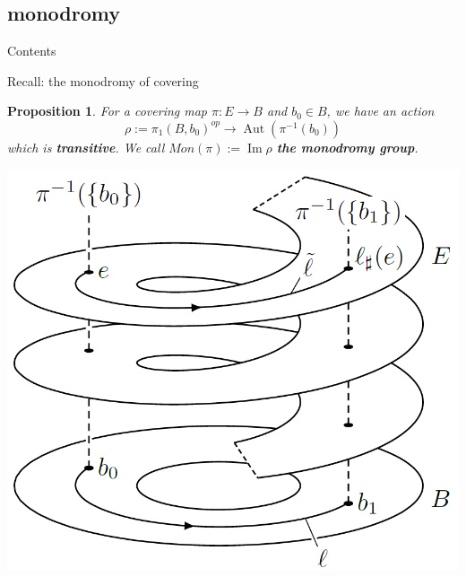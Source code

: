 \documentclass[pdf]{beamer}
\numberwithin{equation}{section}
\theoremstyle{plain}
\newtheorem{proposition}[theorem]{Proposition}
\theoremstyle{plain}
\theoremstyle{remark}
\DeclareMathOperator{\Aut}{\operatorname{Aut}}
\DeclareMathOperator{\Img}{\operatorname{Im}}
\begin{document}
\subsection{monodromy}
\begin{frame}{Contents}
\end{frame}
\begin{frame}{Recall: the monodromy of covering}
\begin{proposition}
		For a covering map $\pi \colon E \longrightarrow B$ and $b_0 \in B$, we have an action
	$$\rho:= \pi_1(B,b_0)^{op} \longrightarrow \Aut (\pi^{-1}(b_0))$$
	which is \textbf{transitive}. We call $Mon(\pi):= \Img \rho$ \textbf{the monodromy group}.
\end{proposition}
	\begin{center}
	\includegraphics[height=.42\textheight]{figures/coveringlift.png}
\end{center}
\end{frame}
\end{document}
